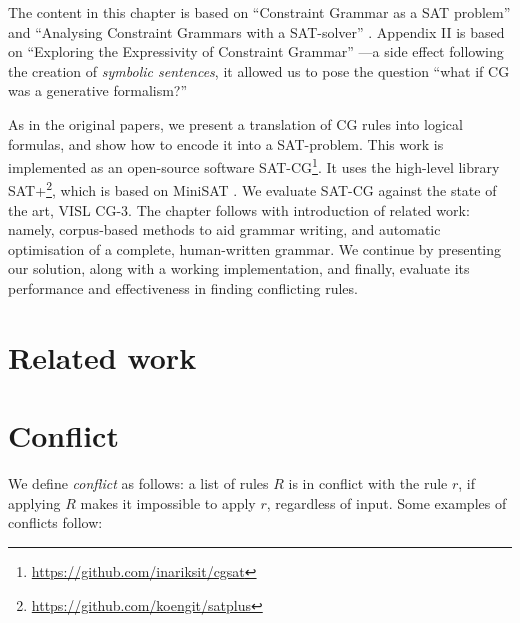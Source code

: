 The content in this chapter is based on ``Constraint Grammar as a SAT
problem'' \cite{listenmaa_claessen2015} and ``Analysing Constraint
Grammars with a SAT-solver'' \cite{listenmaa_claessen2016}. Appendix
II is based on ``Exploring the Expressivity of Constraint
Grammar'' \cite{kokke2017expressivity}---a side effect following the
creation of \emph{symbolic sentences}, it allowed us to pose the question
``what if CG was a generative formalism?''

As in the original papers, we present a translation of CG rules into
logical formulas, and show how to encode it into a SAT-problem.  This
work is implemented as an open-source software
SAT-CG\footnote{\url{https://github.com/inariksit/cgsat}}. It uses the
high-level library
SAT+\footnote{\url{https://github.com/koengit/satplus}}, which is
based on MiniSAT \cite{een04sat}.  We evaluate SAT-CG against the
state of the art, VISL CG-3.  The chapter follows with introduction of
related work: namely, corpus-based methods to aid grammar writing, and
automatic optimisation of a complete, human-written grammar. We
continue by presenting our solution, along with a working
implementation, and finally, evaluate its performance and
effectiveness in finding conflicting rules.

\section{Related work}
\label{sec:cg-related-work}



\section{Conflict}
\label{sec:conflict}


We define \emph{conflict} as follows: a list of rules $R$ is in
conflict with the rule $r$, if applying $R$ makes it impossible to
apply $r$, regardless of input.
Some examples of conflicts follow:

